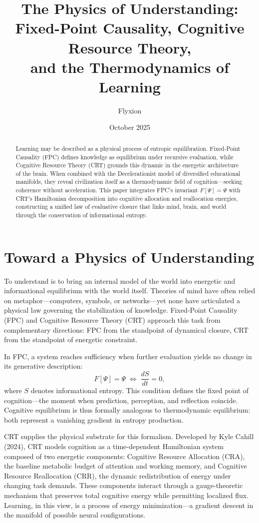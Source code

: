\documentclass[12pt,a4paper]{article}
\title{\Large\bfseries
The Physics of Understanding:\\
Fixed-Point Causality, Cognitive Resource Theory,\\
and the Thermodynamics of Learning}
\author{Flyxion}
\date{October 2025}
\begin{document}
\maketitle

\begin{abstract}
Learning may be described as a physical process of entropic equilibration.
Fixed-Point Causality (FPC) defines knowledge as equilibrium under recursive evaluation, while Cognitive Resource Theory (CRT) grounds this dynamic in the energetic architecture of the brain.
When combined with the Decelerationist model of diversified educational manifolds, they reveal civilization itself as a thermodynamic field of cognition—seeking coherence without acceleration.
This paper integrates FPC’s invariant \(F[\Psi]=\Psi\) with CRT’s Hamiltonian decomposition into cognitive allocation and reallocation energies, constructing a unified law of evaluative closure that links mind, brain, and world through the conservation of informational entropy.
\end{abstract}

\section{Toward a Physics of Understanding}

To understand is to bring an internal model of the world into energetic and informational equilibrium with the world itself.
Theories of mind have often relied on metaphor---computers, symbols, or networks---yet none have articulated a physical law governing the stabilization of knowledge.
Fixed-Point Causality (FPC) and Cognitive Resource Theory (CRT) approach this task from complementary directions: FPC from the standpoint of dynamical closure, CRT from the standpoint of energetic constraint.

In FPC, a system reaches sufficiency when further evaluation yields no change in its generative description:
\begin{equation}
F[\Psi]=\Psi
\;\Longleftrightarrow\;
\frac{dS}{dt}=0,
\end{equation}
where \(S\) denotes informational entropy.
This condition defines the fixed point of cognition—the moment when prediction, perception, and reflection coincide.
Cognitive equilibrium is thus formally analogous to thermodynamic equilibrium: both represent a vanishing gradient in entropy production.

CRT supplies the physical substrate for this formalism.
Developed by Kyle Cahill (2024), CRT models cognition as a time-dependent Hamiltonian system composed of two energetic components: Cognitive Resource Allocation (CRA), the baseline metabolic budget of attention and working memory, and Cognitive Resource Reallocation (CRR), the dynamic redistribution of energy under changing task demands.
These components interact through a gauge-theoretic mechanism that preserves total cognitive energy while permitting localized flux.
Learning, in this view, is a process of energy minimization---a gradient descent in the manifold of possible neural configurations.
\end{document}
